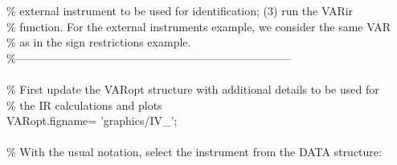 \hspace{1mm}\hspace{5mm} \textcolor{matlabgreen}{\% external instrument to be used \textcolor{matlabblue}{for} identification; (3) run the VARir  }\\ 
\hspace{1mm}\hspace{5mm} \hspace{5mm} \textcolor{matlabgreen}{\% function. For the external instruments example, we consider the same VAR  }\\ 
\hspace{1mm}\hspace{5mm} \hspace{5mm} \textcolor{matlabgreen}{\% as in the sign restrictions example.  }\\ 
\hspace{1mm}\hspace{5mm} \hspace{5mm} \textcolor{matlabgreen}{\%--------------------------------------------------------------------------  }\\ 
\hspace{1mm}\hspace{5mm} \hspace{5mm}  \\ 
\hspace{1mm}\hspace{5mm} \hspace{5mm} \textcolor{matlabgreen}{\% First update the VARopt structure with additional details to be used \textcolor{matlabblue}{for} }\\ 
\hspace{1mm}\hspace{5mm} \hspace{5mm} \hspace{5mm} \textcolor{matlabgreen}{\% the IR calculations and plots }\\ 
\hspace{1mm}\hspace{5mm} \hspace{5mm} \hspace{5mm} VARopt.figname= \textcolor{matlabpurple}{'graphics/IV\_'}; \\ 
\hspace{1mm}\hspace{5mm} \hspace{5mm} \hspace{5mm}  \\ 
\hspace{1mm}\hspace{5mm} \hspace{5mm} \hspace{5mm} \textcolor{matlabgreen}{\% With the usual notation, select the instrument from the DATA structure: }\\ 
